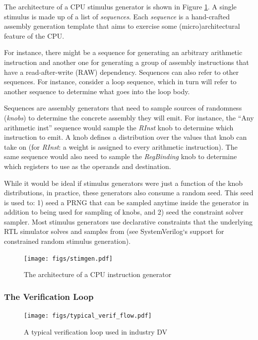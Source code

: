 \documentclass[sigconf,noacm]{acmart}
\begin{document}
The architecture of a CPU stimulus generator is shown in Figure \ref{fig:stimgen}.
A single stimulus is made up of a list of \textit{sequences}.
Each \textit{sequence} is a hand-crafted assembly generation template that aims to exercise some (micro)architectural feature of the CPU.

For instance, there might be a sequence for generating an arbitrary arithmetic instruction and another one for generating a group of assembly instructions that have a read-after-write (RAW) dependency.
Sequences can also refer to other sequences.
For instance, consider a loop sequence, which in turn will refer to another sequence to determine what goes into the loop body.

Sequences are assembly generators that need to sample sources of randomness (\textit{knobs}) to determine the concrete assembly they will emit.
For instance, the ``Any arithmetic inst'' sequence would sample the \textit{RInst} knob to determine which instruction to emit.
A knob defines a distribution over the values that knob can take on (for \textit{RInst}: a weight is assigned to every arithmetic instruction).
The same sequence would also need to sample the \textit{RegBinding} knob to determine which registers to use as the operands and destination.

While it would be ideal if stimulus generators were just a function of the knob distributions, in practice, these generators also consume a random seed.
This seed is used to: 1) seed a PRNG that can be sampled anytime inside the generator in addition to being used for sampling of knobs, and 2) seed the constraint solver sampler.
Most stimulus generators use declarative constraints that the underlying RTL simulator solves and samples from (see SystemVerilog`s support for constrained random stimulus generation).

\begin{figure}
  \texttt{[image: figs/stimgen.pdf]}
  \caption{The architecture of a CPU instruction generator}
  \label{fig:stimgen}
\end{figure}

\subsubsection{The Verification Loop}

\begin{figure}
  \texttt{[image: figs/typical\_verif\_flow.pdf]}
  \caption{A typical verification loop used in industry DV}
  \label{fig:verif_loop}
\end{figure}
\end{document}
